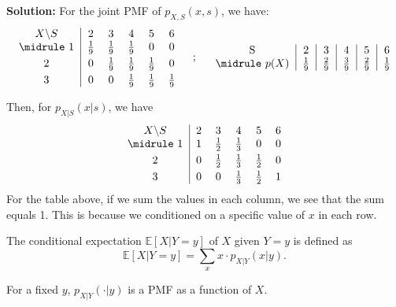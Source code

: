 \begin{eg}
    \textbf{Solution:} 
    For the joint PMF of \(p_{X, S}(x, s)\), we have: 
    \[
        \begin{tabular}{c|c c c c c}
                \(X \backslash S\)  & 2 & 3 & 4 & 5 & 6  \\
            \midrule
                1 & \(\frac{1}{9}\) & \(\frac{1}{9}\) & \(\frac{1}{9}\) & 0 & 0  \\[3pt]
                2 & 0 & \(\frac{1}{9}\) & \(\frac{1}{9}\) & \(\frac{1}{9}\) & 0  \\[3pt]
                3 & 0 & 0 & \(\frac{1}{9}\) & \(\frac{1}{9}\) & \(\frac{1}{9}\)
        \end{tabular}
        \quad ; \quad
        \begin{tabular}{c|c|c|c|c|c}
            S & 2 & 3 & 4 & 5 & 6  \\
            \midrule
            \(p(X)\) & \(\frac{1}{9}\) & \(\frac{2}{9}\) & \(\frac{3}{9}\) & \(\frac{2}{9}\) & \(\frac{1}{9}\)
        \end{tabular}
    \]
    
    Then, for \(p_{X \vert S} (x \vert s)\), we have 
    \[
        \begin{tabular}{c|c c c c c}
                \(X \backslash S\)  & 2 & 3 & 4 & 5 & 6  \\
            \midrule
                1 & 1 & \(\frac{1}{2}\) & \(\frac{1}{3}\) & 0 & 0  \\[3pt]
                2 & 0 & \(\frac{1}{2}\) & \(\frac{1}{3}\) & \(\frac{1}{2}\) & 0  \\[3pt]
                3 & 0 & 0 & \(\frac{1}{3}\) & \(\frac{1}{2}\) & 1
        \end{tabular}
    \]
    For the table above, if we sum the values in each column, we see that the sum equals 1. This is because we conditioned on a specific value of \(x\) in each row.
\end{eg}

\begin{definition}
    The conditional expectation \(\mathbb{E}[X \vert Y = y]\) of \(X\) given \(Y = y\) is defined as 
    \[
        \mathbb{E}[X \vert Y = y] = \sum_{x} x \cdot p_{X \vert Y} (x \vert y).
    \]

    \begin{remark}
        For a fixed \(y\), \(p_{X \vert Y} (\cdot \vert y)\) is a PMF as a function of \(X\). 
    \end{remark} 
\end{definition}

